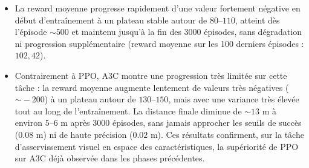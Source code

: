 \begin{itemize}
    \item La reward moyenne progresse rapidement d'une
    valeur fortement négative en début d'entraînement à un plateau stable
    autour de $80$--$110$, atteint dès l'épisode $\sim\!500$ et maintenu
    jusqu'à la fin des 3000 épisodes, sans dégradation ni progression
    supplémentaire (reward moyenne sur les 100 derniers épisodes :
    $102{,}42$).
    \item Contrairement à PPO, A3C montre une progression très limitée sur cette 
    tâche : la reward moyenne augmente lentement de valeurs très négatives 
    ($\sim\!-200$) à un plateau autour de $130$--$150$, mais avec une 
    variance très élevée tout au long de l'entraînement. La distance finale 
    diminue de $\sim\!13$ m à environ $5$--$6$ m après 3000 épisodes, sans 
    jamais approcher les seuils de succès ($0.08$ m) ni de haute précision 
    ($0.02$ m). Ces résultats confirment, sur la tâche d'asservissement 
    visuel en espace des caractéristiques, la supériorité de PPO sur A3C 
    déjà observée dans les phases précédentes.

\end{itemize}
 


